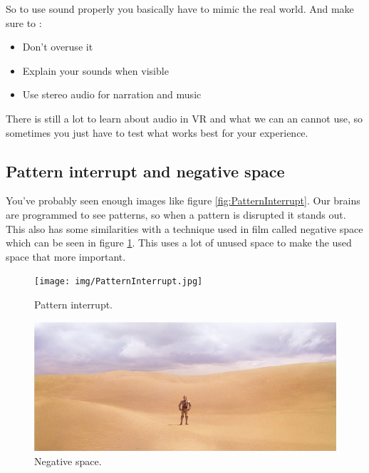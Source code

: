 \documentclass{report}
\begin{document}
				So to use sound properly you basically have to mimic the real world. 
				And make sure to :
				\begin{itemize}
					\item Don't overuse it
					\item Explain your sounds when visible
					\item Use stereo audio for narration and music
				\end{itemize}
				There is still a lot to learn about audio in VR and what we can an cannot use, so sometimes you just have to test what works best for your experience. 
				
				
				\subsection{Pattern interrupt and negative space}
				You've probably seen enough images like figure \ref{fig:PatternInterrupt}. Our brains are programmed to see patterns, so when a pattern is disrupted it stands out. This also has some similarities with a technique used in film called negative space which can be seen in figure \ref{fig:NegativeSpace}. This uses a lot of unused space to make the used space that more important. 
							
				
				\begin{figure}[!h]
					\centering
					\begin{minipage}[b!]{0.35\textwidth}
						\texttt{[image: img/PatternInterrupt.jpg]}
						\caption{Pattern interrupt.}
						\label{fig:PatternInterrupt}
					\end{minipage}
					\hfill
					\begin{minipage}[b!]{0.4\textwidth}
						\includegraphics[width=\textwidth]{img/C3PONegativeSpace.png}
						\caption{Negative space.}
						\label{fig:NegativeSpace}
					\end{minipage}
				\end{figure}
				
\end{document}
